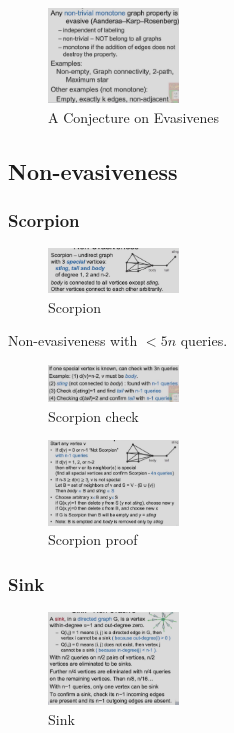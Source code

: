 \begin{figure}[H]
    \centering
    \includegraphics[width=0.309\textwidth]{pic/DAA5/A Conjecture on Evasivenes}
    \caption{A Conjecture on Evasivenes}
\end{figure}



\subsection{Non-evasiveness}
\subsubsection{Scorpion}
\begin{figure}[H]
    \centering
    \includegraphics[width=0.309\textwidth]{pic/DAA5/Scorpion}
    \caption{Scorpion}
\end{figure}

Non-evasiveness with $<5n$ queries.

\begin{figure}[H]
    \centering
    \includegraphics[width=0.309\textwidth]{pic/DAA5/Scorpion check}
    \caption{Scorpion check}
\end{figure}

\begin{figure}[H]
    \centering
    \includegraphics[width=0.309\textwidth]{pic/DAA5/Scorpion proof.png}
    \caption{Scorpion proof}
\end{figure}

\subsubsection{Sink}
\begin{figure}[H]
    \centering
    \includegraphics[width=0.309\textwidth]{pic/DAA5/Sink}
    \caption{Sink}
\end{figure}



